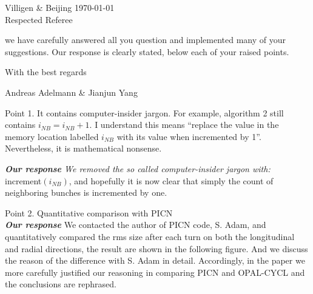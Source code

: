 \documentclass[10pt]{report}
\begin{document}
 Villigen \& Beijing \today \\
 
 Respected Referee
 
 we have carefully answered all you question and implemented many
 of your suggestions. Our response is clearly stated, below each of your raised points.
 
 With the best regards

Andreas Adelmann \& Jianjun Yang

Point 1. It contains computer-insider jargon. For example, algorithm 2 still contains
$i_{NB}=i_{NB}+1$. I understand this means ``replace the value in the memory
location labelled $i_{NB}$ with its value when incremented by 1''.
Nevertheless, it is mathematical nonsense.

 \vspace{+2mm}
 {\it {\bf Our response}  We removed the so called computer-insider jargon with:} \\ increment$(i_{NB})$, and
 hopefully it is now clear that simply the count of neighboring bunches is incremented by one.
 \vspace{+2mm}
 
Point 2. Quantitative comparison with PICN\\  
{\it {\bf Our response}} We contacted the author of PICN code, S. Adam, 
and quantitatively compared the rms size after each turn on both the longitudinal and radial directions, the result are shown in the following figure.
And we discuss the reason of the difference with S. Adam in detail.
Accordingly, in the paper we more carefully justified our reasoning in comparing PICN and OPAL-CYCL and the conclusions are rephrased. 
\end{document}

